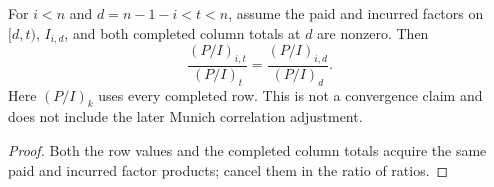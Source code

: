 \begin{theorem}\label{thm:quargMackGap}\leanok
{}
For $i<n$ and $d=n-1-i<t<n$, assume the paid and incurred factors on
$[d,t)$, $I_{i,d}$, and both completed column totals at $d$ are nonzero.  Then
\[
  \frac{(P/I)_{i,t}}{(P/I)_t}
  =
  \frac{(P/I)_{i,d}}{(P/I)_d}.
\]
Here $(P/I)_k$ uses every completed row.  This is not a convergence claim and
does not include the later Munich correlation adjustment.
\end{theorem}
\begin{proof}\leanok Both the row values and the completed column totals acquire the same paid and incurred factor products; cancel them in the ratio of ratios. \end{proof}
